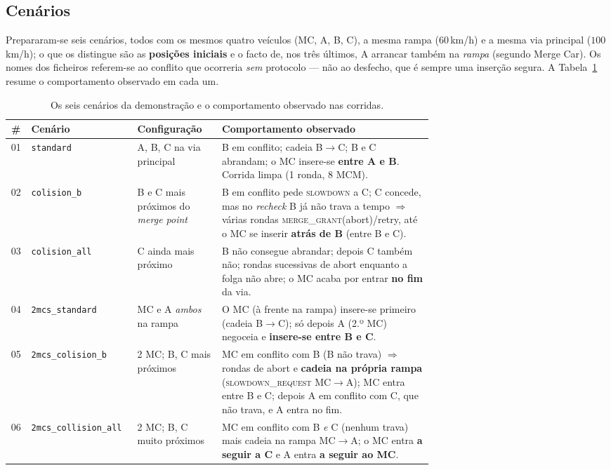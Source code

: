 \documentclass[11pt,a4paper]{article}
\begin{document}
\subsection{Cenários}
\label{sec:demo-cenarios}

Prepararam-se seis cenários, todos com os mesmos quatro veículos (MC, A, B, C), a
mesma rampa ($60$\,km/h) e a mesma via principal ($100$\,km/h); o que os distingue são
as \textbf{posições iniciais} e o facto de, nos três últimos, A arrancar também na
\emph{rampa} (segundo Merge Car). Os nomes dos ficheiros referem-se ao conflito que
ocorreria \emph{sem} protocolo --- não ao desfecho, que é sempre uma inserção segura.
A Tabela~\ref{tab:cenarios} resume o comportamento observado em cada um.

\begin{table}[H]
  \centering
  \scriptsize
  \renewcommand{\arraystretch}{1.3}
  \begin{tabular}{@{}clp{0.20\linewidth}p{0.50\linewidth}@{}}
    \toprule
    \textbf{\#} & \textbf{Cenário} & \textbf{Configuração} &
      \textbf{Comportamento observado} \\
    \midrule
    01 & \texttt{standard} & A, B, C na via principal &
      B em conflito; cadeia B$\rightarrow$C; B e C abrandam; o MC insere-se
      \textbf{entre A e B}. Corrida limpa (1 ronda, 8 MCM). \\
    02 & \texttt{colision\_b} & B e C mais próximos do \emph{merge point} &
      B em conflito pede \textsc{slowdown} a C; C concede, mas no \emph{recheck} B já
      não trava a tempo $\Rightarrow$ várias rondas \textsc{merge\_grant}(abort)/retry,
      até o MC se inserir \textbf{atrás de B} (entre B e C). \\
    03 & \texttt{colision\_all} & C ainda mais próximo &
      B não consegue abrandar; depois C também não; rondas sucessivas de abort
      enquanto a folga não abre; o MC acaba por entrar \textbf{no fim} da via. \\
    04 & \texttt{2mcs\_standard} & MC e A \emph{ambos} na rampa &
      O MC (à frente na rampa) insere-se primeiro (cadeia B$\rightarrow$C); só depois A
      (2.º MC) negoceia e \textbf{insere-se entre B e C}. \\
    05 & \texttt{2mcs\_colision\_b} & 2 MC; B, C mais próximos &
      MC em conflito com B (B não trava) $\Rightarrow$ rondas de abort e
      \textbf{cadeia na própria rampa} (\textsc{slowdown\_request} MC$\rightarrow$A);
      MC entra entre B e C; depois A em conflito com C, que não trava, e A entra no fim. \\
    06 & \texttt{2mcs\_collision\_all} & 2 MC; B, C muito próximos &
      MC em conflito com B \emph{e} C (nenhum trava) mais cadeia na rampa
      MC$\rightarrow$A; o MC entra \textbf{a seguir a C} e A entra \textbf{a seguir ao
      MC}. \\
    \bottomrule
  \end{tabular}
  \caption{Os seis cenários da demonstração e o comportamento observado nas corridas.}
  \label{tab:cenarios}
\end{table}
\end{document}
